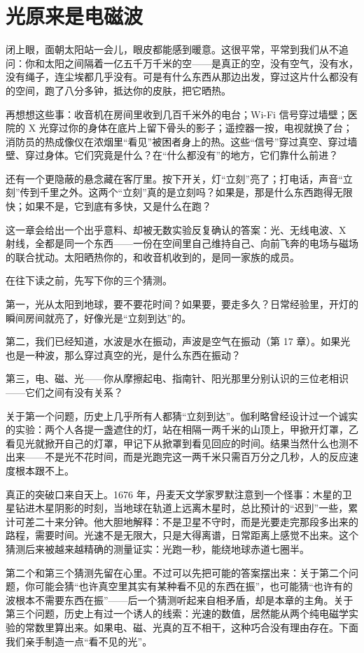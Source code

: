 \chapter{光原来是电磁波}


\begin{mainline}
闭上眼，面朝太阳站一会儿，眼皮都能感到暖意。这很平常，平常到我们从不追问：你和太阳之间隔着一亿五千万千米的空——是真正的空，没有空气，没有水，没有绳子，连尘埃都几乎没有。可是有什么东西从那边出发，穿过这片什么都没有的空间，跑了八分多钟，抵达你的皮肤，把它晒热。

再想想这些事：收音机在房间里收到几百千米外的电台；Wi-Fi 信号穿过墙壁；医院的 X 光穿过你的身体在底片上留下骨头的影子；遥控器一按，电视就换了台；消防员的热成像仪在浓烟里“看见”被困者身上的热。这些“信号”穿过真空、穿过墙壁、穿过身体。它们究竟是什么？在“什么都没有”的地方，它们靠什么前进？

还有一个更隐蔽的悬念藏在客厅里。按下开关，灯“立刻”亮了；打电话，声音“立刻”传到千里之外。这两个“立刻”真的是立刻吗？如果是，那是什么东西跑得无限快；如果不是，它到底有多快，又是什么在跑？

这一章会给出一个出乎意料、却被无数实验反复确认的答案：光、无线电波、X 射线，全都是同一个东西——一份在空间里自己维持自己、向前飞奔的电场与磁场的联合扰动。太阳晒热你的，和收音机收到的，是同一家族的成员。
\end{mainline}


\begin{mainline}
在往下读之前，先写下你的三个猜测。

第一，光从太阳到地球，要不要花时间？如果要，要走多久？日常经验里，开灯的瞬间房间就亮了，好像光是“立刻到达”的。

第二，我们已经知道，水波是水在振动，声波是空气在振动（第 17 章）。如果光也是一种波，那么穿过真空的光，是什么东西在振动？

第三，电、磁、光——你从摩擦起电、指南针、阳光那里分别认识的三位老相识——它们之间有没有关系？

关于第一个问题，历史上几乎所有人都猜“立刻到达”。伽利略曾经设计过一个诚实的实验：两个人各提一盏遮住的灯，站在相隔一两千米的山顶上，甲掀开灯罩，乙看见光就掀开自己的灯罩，甲记下从掀罩到看见回应的时间。结果当然什么也测不出来——不是光不花时间，而是光跑完这一两千米只需百万分之几秒，人的反应速度根本跟不上。

真正的突破口来自天上。1676 年，丹麦天文学家罗默注意到一个怪事：木星的卫星钻进木星阴影的时刻，当地球在轨道上远离木星时，总比预计的“迟到”一些，累计可差二十来分钟。他大胆地解释：不是卫星不守时，而是光要走完那段多出来的路程，需要时间。光速不是无限大，只是大得离谱，日常距离上感觉不出来。这个猜测后来被越来越精确的测量证实：光跑一秒，能绕地球赤道七圈半。

第二个和第三个猜测先留在心里。不过可以先把可能的答案摆出来：关于第二个问题，你可能会猜“也许真空里其实有某种看不见的东西在振”，也可能猜“也许有的波根本不需要东西在振”——后一个猜测听起来自相矛盾，却是本章的主角。关于第三个问题，历史上有过一个诱人的线索：光速的数值，居然能从两个纯电磁学实验的常数里算出来。如果电、磁、光真的互不相干，这种巧合没有理由存在。下面我们亲手制造一点“看不见的光”。
\end{mainline}


